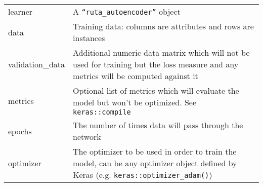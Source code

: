 \begin{longtable}[c]{@{}>{\small}p{3cm}>{\raggedright}p{12.5cm}@{}}
\toprule
\begin{minipage}[t]{0.09\columnwidth}\raggedright\strut
learner
\strut\end{minipage} &
\begin{minipage}[t]{0.84\columnwidth}\raggedright\strut
A \texttt{``ruta\_autoencoder''} object
\strut\end{minipage}\tabularnewline
\begin{minipage}[t]{0.09\columnwidth}\raggedright\strut
data
\strut\end{minipage} &
\begin{minipage}[t]{0.84\columnwidth}\raggedright\strut
Training data: columns are attributes and rows are instances
\strut\end{minipage}\tabularnewline
\begin{minipage}[t]{0.09\columnwidth}\raggedright\strut
validation\_data
\strut\end{minipage} &
\begin{minipage}[t]{0.84\columnwidth}\raggedright\strut
Additional numeric data matrix which will not be used for training but
the loss measure and any metrics will be computed against it
\strut\end{minipage}\tabularnewline
\begin{minipage}[t]{0.09\columnwidth}\raggedright\strut
metrics
\strut\end{minipage} &
\begin{minipage}[t]{0.84\columnwidth}\raggedright\strut
Optional list of metrics which will evaluate the model but won't be
optimized. See \texttt{keras::compile}
\strut\end{minipage}\tabularnewline
\begin{minipage}[t]{0.09\columnwidth}\raggedright\strut
epochs
\strut\end{minipage} &
\begin{minipage}[t]{0.84\columnwidth}\raggedright\strut
The number of times data will pass through the network
\strut\end{minipage}\tabularnewline
\begin{minipage}[t]{0.09\columnwidth}\raggedright\strut
optimizer
\strut\end{minipage} &
\begin{minipage}[t]{0.84\columnwidth}\raggedright\strut
The optimizer to be used in order to train the model, can be any
optimizer object defined by Keras (e.g.
\texttt{keras::optimizer\_adam()})

\end{minipage}
\end{longtable}

